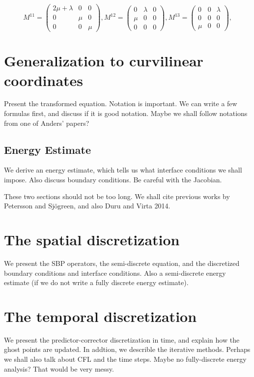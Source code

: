 \documentclass[a4paper]{article}
\begin{document}
\[ M^{11} = \left(\begin{array}{ccc}
2\mu+\lambda & 0 & 0\\
0 & \mu & 0\\
0 & 0 & \mu\end{array}\right), M^{12} = \left(\begin{array}{ccc}
0 & \lambda & 0\\
\mu & 0 & 0\\
0 & 0 & 0\end{array}\right), M^{13} = \left(\begin{array}{ccc}
0 & 0 & \lambda\\
0 & 0 & 0\\
\mu & 0 & 0\end{array}\right),\]


\section{Generalization to curvilinear coordinates}
Present the transformed equation. Notation is important. We can write a few formulas first, and discuss if it is good notation. Maybe we shall follow notations from one of Anders' papers?

\subsection{Energy Estimate}
We derive an energy estimate, which tells us what interface conditions we shall impose. Also discuss boundary conditions. Be careful with the Jacobian.

These two sections should not be too long. We shall cite previous works by Petersson and Sjögreen, and also Duru and Virta 2014. 

\section{The spatial discretization}
We present the SBP operators, the semi-discrete equation, and the discretized boundary conditions and interface conditions. Also a semi-discrete energy estimate (if we do not write a fully discrete energy estimate).

\section{The temporal discretization}
We present the predictor-corrector discretization in time, and explain how the ghost points are updated. In addtion, we describle the iterative methods. Perhaps we shall also talk about CFL and the time steps. Maybe no fully-discrete energy analysis? That would be very messy. 
\end{document}
